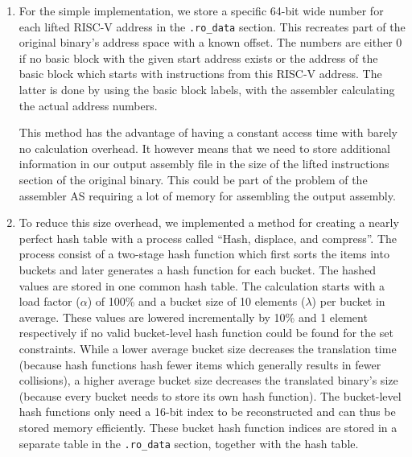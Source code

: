 \documentclass[course=eragp]{aspdoc}
\begin{document}
\begin{enumerate}
    \item For the simple implementation, we store a specific 64-bit wide number for each lifted RISC-V address
          in the \texttt{.ro\_data} section. This recreates part of the original binary's address
          space with a known offset. The numbers are either 0 if no basic block with the given start address
          exists or the address of the basic block which starts with instructions from this RISC-V address.
          The latter is done by using the basic block labels, with the assembler calculating the actual
          address numbers.
          \par
          This method has the advantage of having a constant access time with barely no calculation overhead. It
          however means that we need to store additional information in our output assembly file in the size of the
          lifted instructions section of the original binary. This could be part of the problem of the
          assembler AS requiring a lot of memory for assembling the output assembly.

    \item To reduce this size overhead, we implemented a method for creating a nearly perfect hash table with a
          process called ``Hash, displace, and compress''\cite{CHD}. The process consist of a two-stage hash
          function which first sorts the items into buckets and later generates a hash function for each
          bucket. The hashed values are stored in one common hash table. The calculation starts with a load
          factor ($\alpha$) of 100\% and a bucket size of 10 elements ($\lambda$) per bucket in average. These values are lowered
          incrementally by 10\% and 1 element respectively if no valid bucket-level hash function could be found for the
          set constraints.
          While a lower average bucket size decreases the translation time (because hash functions hash
          fewer items which generally results in fewer collisions), a higher average bucket size decreases the translated binary's size (because
          every bucket needs to store its own hash function).
          The bucket-level hash functions only need a 16-bit index to be reconstructed and can
          thus
          be stored memory efficiently. These bucket hash function indices are stored in a separate table in
          the \texttt{.ro\_data} section, together with the hash table.

          \par


\end{enumerate}
\end{document}
